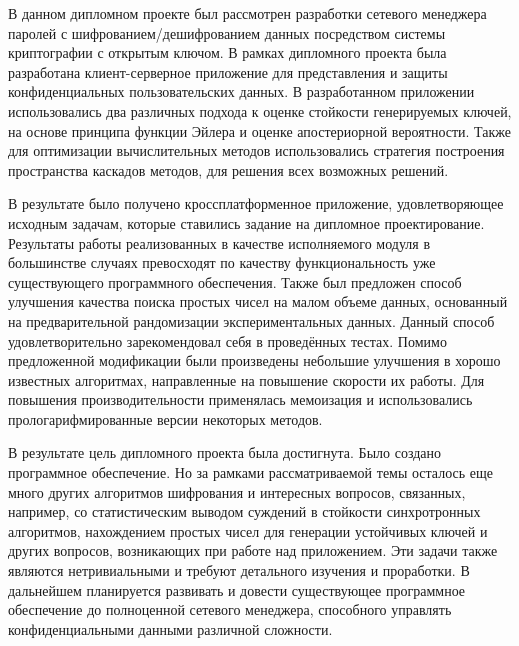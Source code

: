 
В данном дипломном проекте был рассмотрен разработки сетевого менеджера паролей с шифрованием/дешифрованием данных посредством системы криптографии с открытым ключом.
В рамках дипломного проекта была разработана клиент-серверное приложение для представления и защиты конфиденциальных пользовательских данных.
В разработанном приложении использовались два различных подхода к оценке стойкости генерируемых ключей, на основе принципа функции Эйлера и оценке апостериорной вероятности.
Также для оптимизации вычислительных методов использовались стратегия построения пространства каскадов методов, для решения всех возможных решений.

В результате было получено кроссплатформенное приложение, удовлетворяющее исходным задачам, которые ставились задание на дипломное проектирование.
Результаты работы реализованных в качестве исполняемого модуля в большинстве случаях превосходят по качеству функциональность уже существующего программного обеспечения.
Также был предложен способ улучшения качества поиска простых чисел на малом объеме данных, основанный на предварительной рандомизации экспериментальных данных.
Данный способ удовлетворительно зарекомендовал себя в проведённых тестах.
Помимо предложенной модификации были произведены небольшие улучшения в хорошо известных алгоритмах, направленные на повышение скорости их работы.
Для повышения производительности применялась мемоизация и использовались прологарифмированные версии некоторых методов.

В результате цель дипломного проекта была достигнута.
Было создано программное обеспечение.
Но за рамками рассматриваемой темы осталось еще много других алгоритмов шифрования и интересных вопросов, связанных, например, со статистическим выводом суждений в стойкости синхротронных алгоритмов, нахождением простых чисел для генерации устойчивых ключей и других вопросов, возникающих при работе над приложением.
Эти задачи также являются нетривиальными и требуют детального изучения и проработки.
В дальнейшем планируется развивать и довести существующее программное обеспечение до полноценной сетевого менеджера, способного управлять конфиденциальными данными различной сложности.